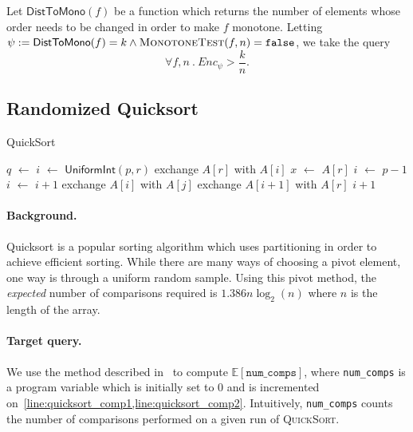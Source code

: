 \documentclass[acmsmall,review,anonymous]{acmart}\settopmatter{printfolios=true,printccs=false,printacmref=false}
\newcommand*\Let[2]{\State #1 $\gets$ #2}
\newcommand*\E[1]{\mathbb{E}\left[ #1 \right]}
\begin{document}
Let $\mathsf{DistToMono}(f)$ be a function which returns the number of elements whose order needs to be changed in order to make $f$ monotone.
% 
Letting $\psi := \mathsf{DistToMono}(f) = k \wedge \textsc{MonotoneTest}(f,n) = \texttt{false}$, we take the query
% 
\begin{equation*}
  \forall f,n~.~Enc_\psi > \frac{k}{n}.
\end{equation*}

\subsection{Randomized Quicksort}
\label{sec:quicksort}

\begin{algorithm}
  \caption{QuickSort}
  \label{alg:quicksort}  
  \begin{algorithmic}[1]
     \label{line:quicksort_comp1}
    \Let{$q$}{}
    \State{}
    \State{}
    \EndIf
    \EndFunction
    \Statex
    \Let{$i$}{$\mathsf{UniformInt}(p,r)$}
    \State exchange $A[r]$ with $A[i]$
    \Let{$x$}{$A[r]$}
    \Let{$i$}{$p-1$}
     \label{line:quicksort_comp2}
    \Let{$i$}{$i + 1$}
    \State exchange $A[i]$ with $A[j]$
    \EndIf
    \EndFor
    \State exchange $A[i+1]$ with $A[r]$
    \State\Return $i+1$
    \EndFunction
  \end{algorithmic}
\end{algorithm}

\paragraph*{Background.}
Quicksort is a popular sorting algorithm which uses partitioning in order to achieve efficient sorting.
% 
While there are many ways of choosing a pivot element, one way is through a uniform random sample.
% 
Using this pivot method, the \textit{expected} number of comparisons required is $1.386 n \log_2(n)$ where $n$ is the length of the array.

\paragraph*{Target query.}
We use the method described in~ to compute $\E{\mathtt{num\_comps}}$, where \texttt{num\_comps} is a program variable which is initially set to 0 and is incremented on~\cref{line:quicksort_comp1,line:quicksort_comp2}.
% 
Intuitively, \texttt{num\_comps} counts the number of comparisons performed on a given run of \textsc{QuickSort}.
\end{document}
